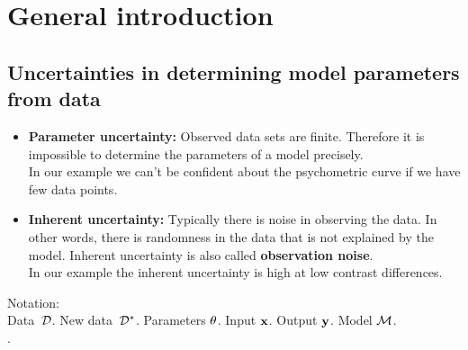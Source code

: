
\section*{General introduction} %
\label{sec:general_introduction}

\subsection{Uncertainties in determining model parameters from data} %
\label{sub:uncertainties_in_determining_model_parameters_from_data}
\begin{itemize}
	\item \textbf{Parameter uncertainty:}
	Observed data sets are finite. Therefore it is impossible to determine the parameters of a model precisely. \\
	In our example we can't be confident about the psychometric curve if we have few data points.
	\item \textbf{Inherent uncertainty:}
	Typically there is noise in observing the data. In other words, there is randomness in the data that is not explained by the model.
	Inherent uncertainty is also called \textbf{observation noise}. \\
	In our example the inherent uncertainty is high at low contrast differences.
\end{itemize}

Notation: \\
Data $\,\mathcal{D}$. New data $\,\mathcal{D}^*$. Parameters $\theta$. Input ${\bf x}$. Output ${\bf y}$. Model $\mathcal{M}$. \\
.

